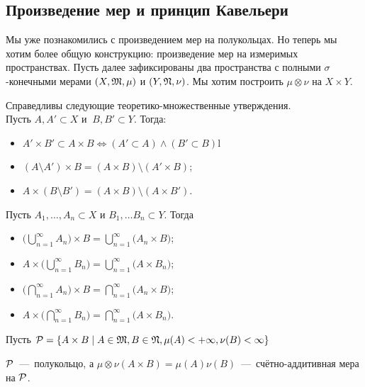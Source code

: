 \subsection{Произведение мер и принцип Кавельери}
Мы уже познакомились с произведением мер на полукольцах. Но теперь мы хотим более общую конструкцию: произведение мер на измеримых пространствах.
Пусть далее зафиксированы два пространства с полными $\sigma$-конечными мерами $(X, \mathfrak{M}, \mu)$ и $(Y, \mathfrak{N}, \nu)$. Мы хотим построить $\mu\otimes\nu$ на $X\times Y$.
\begin{fact}
    Справедливы следующие теоретико-множественные утверждения. \\ Пусть $A, A' \subset X \text{ и } \ B, B' \subset Y$. Тогда:
    \begin{itemize}
        \item $A'\times B' \subset A \times B \Longleftrightarrow (A' \subset A) \wedge (B' \subset B)$l
        \item $(A \setminus A') \times B = (A \times B) \setminus (A' \times B)$;
        \item $A \times (B \setminus B') = (A \times B) \setminus (A \times B')$.
    \end{itemize}
    Пусть $A_1, \ldots, A_n \subset X$ и $B_1, \ldots B_n \subset Y$. Тогда 
    \begin{itemize}
        \item $\biggl(\bigcup\limits_{n = 1}^\infty A_n \biggr) \times B = \bigcup\limits_{n = 1}^\infty \biggl(A_n \times B\biggr)$;
        \item $A \times \biggl(\bigcup\limits_{n = 1}^\infty B_n \biggr) = \bigcup\limits_{n = 1}^\infty \biggl(A \times B_n\biggr)$;
        \item $\biggl(\bigcap\limits_{n = 1}^\infty A_n \biggr) \times B = \bigcap\limits_{n = 1}^\infty \biggl(A_n \times B\biggr)$;
        \item $A \times \biggl(\bigcap\limits_{n = 1}^\infty B_n \biggr) = \bigcap\limits_{n = 1}^\infty \biggl(A \times B_n\biggr)$.

        
    \end{itemize}
\end{fact}
Пусть $\mathcal{P} = \{A \times B \mid A \in \mathfrak{M}, B \in \mathfrak{N}, \mu(A) < +\infty, \nu(B) < \infty\}$
\begin{lemma}
    $\mathcal{P}$~---~полукольцо, а $\mu\otimes\nu(A \times B) = \mu(A)\nu(B)$~---~счётно-аддитивная мера на $\mathcal{P}$.
\end{lemma}
